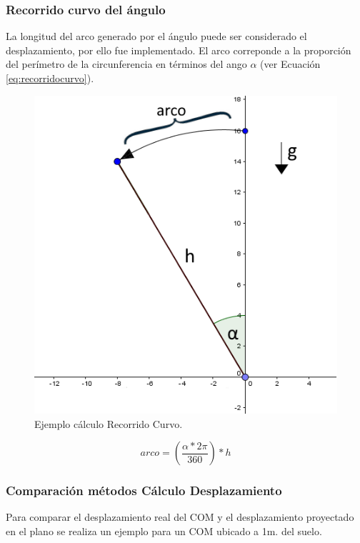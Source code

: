\documentclass[12pt,a4paper]{article}
\begin{document}
\newpage
\subsubsection{Recorrido curvo del ángulo}
La longitud del arco generado por el ángulo puede ser considerado el desplazamiento, por ello fue implementado.
El arco correponde a la proporción del perímetro de la circunferencia en términos del ango $\alpha$ (ver Ecuación \ref{eq:recorridocurvo}).

\begin{figure}[H]
	\centering
	\includegraphics[scale=0.7]{images/calculoRecorridoCurvo}
	\caption{Ejemplo cálculo Recorrido Curvo.}
	\label{fig:recorridocurvo}
\end{figure}

\begin{equation}
	\label{eq:recorridocurvo}
	arco=\left(\frac{\alpha*2\pi}{360}\right)*h
\end{equation}

\newpage
\subsubsection{Comparación métodos Cálculo Desplazamiento}
Para comparar el desplazamiento real del COM y el desplazamiento proyectado en el plano se realiza un ejemplo para un COM ubicado a 1m. del suelo.
\end{document}
